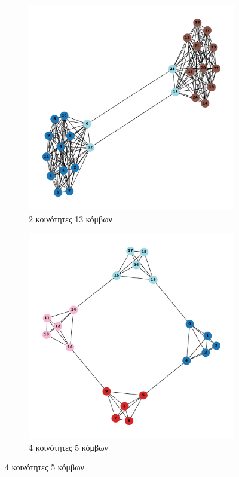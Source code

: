 \documentclass[10pt, letterpaper]{article}
\begin{document}
\begin{figure}
  \begin{subfigure}{0.5\textwidth}
    \centering
    \includegraphics[width=0.8\linewidth]{AUTO2,13.pdf}
    \caption{2 κοινότητες 13 κόμβων}
    \label{}
  \end{subfigure}
  \begin{subfigure}{0.5\textwidth}
    \centering
    \includegraphics[width=0.8\linewidth]{AUTO4,5.pdf}
    \caption{4 κοινότητες 5 κόμβων}
    \label{}
  \end{subfigure}

  \vfill


\end{figure}
\end{document}
